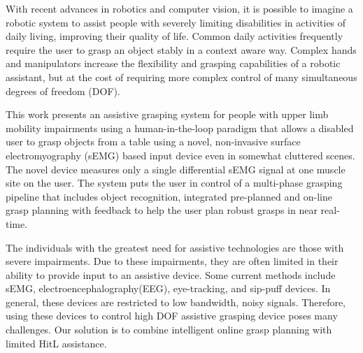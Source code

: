 With recent advances in robotics and computer vision, it is possible to imagine a
robotic  system  to  assist  people  with  severely  limiting  disabilities  in  activities  of
daily living, improving their quality of life. Common daily activities frequently require the user
to grasp an object stably in a context aware way. Complex hands and manipulators
increase the flexibility and grasping capabilities of a robotic assistant, but at the cost
of requiring more complex control of many simultaneous degrees of freedom (DOF). 

This work presents an assistive grasping system
for people  with  upper  limb  mobility
impairments using a human-in-the-loop paradigm that allows a disabled user to grasp objects
from a table using a novel, non-invasive surface electromyography (sEMG) based input device even in somewhat cluttered scenes. The novel device measures  only  a  single  differential  sEMG  signal  at  one
muscle site on the user. The system puts the user in control of a multi-phase grasping pipeline that includes object recognition, integrated pre-planned and on-line grasp planning with feedback  to  help  the  user  plan  robust  grasps  in  near  real-time.  

The individuals with the greatest need for assistive technologies are those with severe impairments. Due to these impairments, they are often limited in their ability to provide input to an assistive device. Some current methods include sEMG, electroencephalography(EEG), eye-tracking, and sip-puff devices. In general, these devices are restricted to low bandwidth, noisy signals. Therefore, using these devices to control high DOF assistive grasping device poses many challenges.  Our solution is to combine intelligent online grasp planning with limited HitL assistance.

